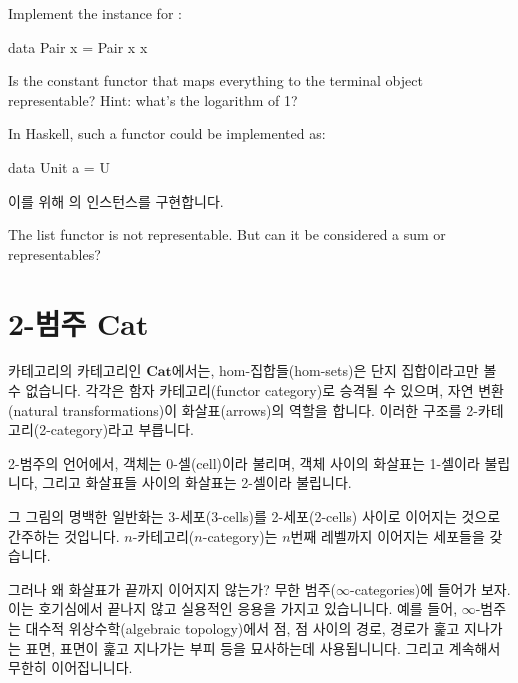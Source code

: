 \documentclass[DaoFP]{subfiles}
\begin{document}
\begin{exercise}
Implement the  instance for :
\begin{haskell}
data Pair x = Pair x x
\end{haskell}
\end{exercise}

\begin{exercise}
Is the constant functor that maps everything to the terminal object representable? Hint: what's the logarithm of 1?

In Haskell, such a functor could be implemented as:
\begin{haskell}
data Unit a = U
\end{haskell}
이를 위해 의 인스턴스를 구현합니다.
\end{exercise}

\begin{exercise}
The list functor is not representable. But can it be considered a sum or representables?
\end{exercise}

\section{2-범주 $\mathbf{Cat}$ }

카테고리의 카테고리인 $\mathbf{Cat}$에서는, hom-집합들(hom-sets)은 단지 집합이라고만 볼 수 없습니다. 각각은 함자 카테고리(functor category)로 승격될 수 있으며, 자연 변환(natural transformations)이 화살표(arrows)의 역할을 합니다. 이러한 구조를 2-카테고리(2-category)라고 부릅니다.

2-범주의 언어에서, 객체는 0-셀(cell)이라 불리며, 객체 사이의 화살표는 1-셀이라 불립니다, 그리고 화살표들 사이의 화살표는 2-셀이라 불립니다.

그 그림의 명백한 일반화는 3-세포(3-cells)를 2-세포(2-cells) 사이로 이어지는 것으로 간주하는 것입니다. $n$-카테고리($n$-category)는 $n$번째 레벨까지 이어지는 세포들을 갖습니다.

그러나 왜 화살표가 끝까지 이어지지 않는가? 무한 범주($\infty$-categories)에 들어가 보자. 이는 호기심에서 끝나지 않고 실용적인 응용을 가지고 있습니니다. 예를 들어, $\infty$-범주는 대수적 위상수학(algebraic topology)에서 점, 점 사이의 경로, 경로가 훑고 지나가는 표면, 표면이 훑고 지나가는 부피 등을 묘사하는데 사용됩니니다. 그리고 계속해서 무한히 이어집니니다.
\end{document}
